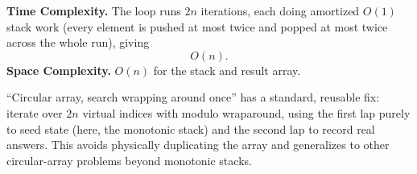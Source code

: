 \begin{complexitybox}
\textbf{Time Complexity.} The loop runs $2n$ iterations, each doing
amortized $O(1)$ stack work (every element is pushed at most twice and
popped at most twice across the whole run), giving
\[
  O(n).
\]
\textbf{Space Complexity.} $O(n)$ for the stack and result array.
\end{complexitybox}

\begin{takeawaybox}
``Circular array, search wrapping around once'' has a standard, reusable
fix: iterate over $2n$ virtual indices with modulo wraparound, using the
first lap purely to seed state (here, the monotonic stack) and the second
lap to record real answers. This avoids physically duplicating the array
and generalizes to other circular-array problems beyond monotonic stacks.
\end{takeawaybox}
